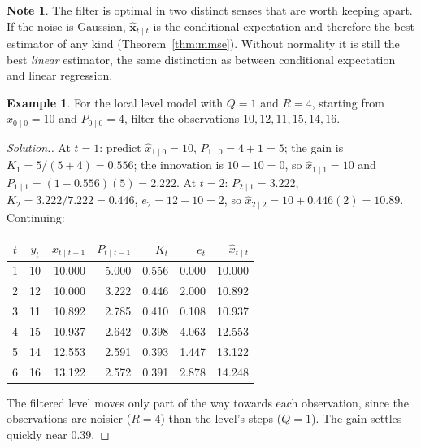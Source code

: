 \documentclass[11pt,a4paper]{article}
\theoremstyle{definition}
\newtheorem{exa}[thm]{Example}
\newtheorem*{note}{Note}
\newenvironment{solution}
  {\renewcommand{\qedsymbol}{}\begin{proof}[\textit{Solution}.]}
  {\end{proof}}
\begin{document}
\begin{note}
The filter is optimal in two distinct senses that are worth keeping apart. If the noise is Gaussian, $\hat{\mathbf{x}}_{t\mid t}$ is the
conditional expectation and therefore the best estimator of any kind (Theorem~\ref{thm:mmse}). Without normality it is still the
best \emph{linear} estimator, the same distinction as between conditional expectation and linear regression.
\end{note}

\begin{exa}\label{exa:kalman}
For the local level model with $Q = 1$ and $R = 4$, starting from $\hat x_{0\mid0} = 10$ and $P_{0\mid0} = 4$, filter the observations $10, 12, 11, 15, 14, 16$.
\end{exa}

\begin{solution}
At $t = 1$: predict $\hat x_{1\mid0} = 10$, $P_{1\mid0} = 4 + 1 = 5$; the gain is $K_1 = 5/(5 + 4) = 0.556$; the innovation is $10 - 10 = 0$, so $\hat x_{1\mid1} = 10$ and
$P_{1\mid1} = (1 - 0.556)(5) = 2.222$. At $t = 2$: $P_{2\mid1} = 3.222$, $K_2 = 3.222/7.222 = 0.446$, $e_2 = 12 - 10 = 2$, so $\hat x_{2\mid2} = 10 + 0.446(2) = 10.89$. Continuing:
\begin{center}
\begin{tabular}{ccrrrrr}
$t$ & $y_t$ & $\hat x_{t\mid t-1}$ & $P_{t\mid t-1}$ & $K_t$ & $e_t$ & $\hat x_{t\mid t}$ \\
\hline
1 & 10 & 10.000 & 5.000 & 0.556 & 0.000 & 10.000 \\
2 & 12 & 10.000 & 3.222 & 0.446 & 2.000 & 10.892 \\
3 & 11 & 10.892 & 2.785 & 0.410 & 0.108 & 10.937 \\
4 & 15 & 10.937 & 2.642 & 0.398 & 4.063 & 12.553 \\
5 & 14 & 12.553 & 2.591 & 0.393 & 1.447 & 13.122 \\
6 & 16 & 13.122 & 2.572 & 0.391 & 2.878 & 14.248 \\
\end{tabular}
\end{center}
The filtered level moves only part of the way towards each observation, since the observations are noisier ($R = 4$)
than the level's steps ($Q = 1$). The gain settles quickly near $0.39$.
\end{solution}
\end{document}
